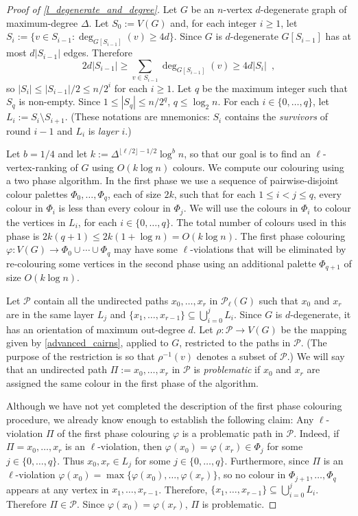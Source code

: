 \documentclass{patmorin}
\newcommand{\defin}[1]{\emph{\color{brightmaroon}#1}}
\begin{document}
\begin{proof}[Proof of \cref{l_degenerate_and_degree}]
  Let $G$ be an $n$-vertex $d$-degenerate graph of maximum-degree $\Delta$.  Let $S_0:=V(G)$ and, for each integer $i\ge 1$, let $S_i:=\{v\in S_{i-1}:\deg_{G[S_{i-1}]}(v)\ge 4d\}$.  Since $G$ is $d$-degenerate $G[S_{i-1}]$ has at most $d|S_{i-1}|$ edges.  Therefore
  \[
    2d|S_{i-1}|\ge \sum_{v\in S_{i-1}} \deg_{G[S_{i-1}]}(v)\ge 4d|S_i| \enspace ,
  \]
  so $|S_i|\le |S_{i-1}|/2\le n/2^i$ for each $i\ge 1$.  Let $q$ be the maximum integer such that $S_q$ is non-empty.  Since $1\le |S_q|\le n/2^q$, $q\le \log_2 n$.  For each $i\in\{0,\ldots,q\}$, let $L_i:=S_i\setminus S_{i+1}$.  (These notations are mnemonics: $S_i$ contains the \defin{survivors} of round $i-1$ and $L_i$ is \defin{layer} $i$.)

  Let $b=1/4$ and let $k:=\Delta^{\lfloor\ell/2\rfloor-1/2}\log^b n$, so that our goal is to find an $\ell$-vertex-ranking of $G$ using $O(k\log n)$ colours. We compute our colouring using a two phase algorithm. In the first phase we use a sequence of pairwise-disjoint colour palettes $\Phi_0,\ldots,\Phi_{q}$, each of size $2k$, such that for each $1\le i < j\le q$, every colour in $\Phi_i$ is less than every colour in $\Phi_j$.  We will use the colours in $\Phi_i$ to colour the vertices in $L_i$, for each $i\in\{0,\ldots,q\}$.  The total number of colours used in this phase is $2k(q+1)\le 2k(1+\log n)= O(k\log n)$.  The first phase colouring $\varphi:V(G)\to\Phi_0\cup\cdots\cup\Phi_q$ may have some $\ell$-violations that will be eliminated by re-colouring some vertices in the second phase using an additional palette $\Phi_{q+1}$ of size $O(k\log n)$.

  Let $\mathcal{P}$ contain all the undirected paths $x_0,\ldots,x_r$ in $\mathcal{P}_{\ell}(G)$ such that $x_0$ and $x_r$ are in the same layer $L_j$ and $\{x_1,\ldots,x_{r-1}\}\subseteq \bigcup_{i=0}^j L_i$.  Since $G$ is $d$-degenerate, it has an orientation of maximum out-degree $d$.  Let $\rho:\mathcal{P}\to V(G)$ be the mapping given by \cref{advanced_cairns}, applied to $G$, restricted to the paths in $\mathcal{P}$. (The purpose of the restriction is so that $\rho^{-1}(v)$ denotes a subset of $\mathcal{P}$.)  We will say that an undirected path $\Pi:=x_0,\ldots,x_r$ in $\mathcal{P}$ is \defin{problematic} if $x_0$ and $x_r$ are assigned the same colour in the first phase of the algorithm.

  Although we have not yet completed the description of the first phase colouring procedure, we already know enough to establish the following claim:  Any $\ell$-violation $\Pi$ of the first phase colouring $\varphi$ is a problematic path in $\mathcal{P}$.  Indeed, if $\Pi=x_0,\ldots,x_r$ is an $\ell$-violation, then $\varphi(x_0)=\varphi(x_r)\in \Phi_j$ for some $j\in\{0,\ldots,q\}$.  Thus $x_0,x_r\in L_j$ for some $j\in\{0,\ldots,q\}$.  Furthermore, since $\Pi$ is an $\ell$-violation $\varphi(x_0)=\max\{\varphi(x_0),\ldots,\varphi(x_r)\}$, so no colour in $\Phi_{j+1},\ldots,\Phi_q$ appears at any vertex in $x_1,\ldots,x_{r-1}$.  Therefore, $\{x_1,\ldots,x_{r-1}\}\subseteq \bigcup_{i=0}^j L_i$.  Therefore $\Pi\in\mathcal{P}$.  Since $\varphi(x_0)=\varphi(x_r)$, $\Pi$ is problematic.


\end{proof}
\end{document}
